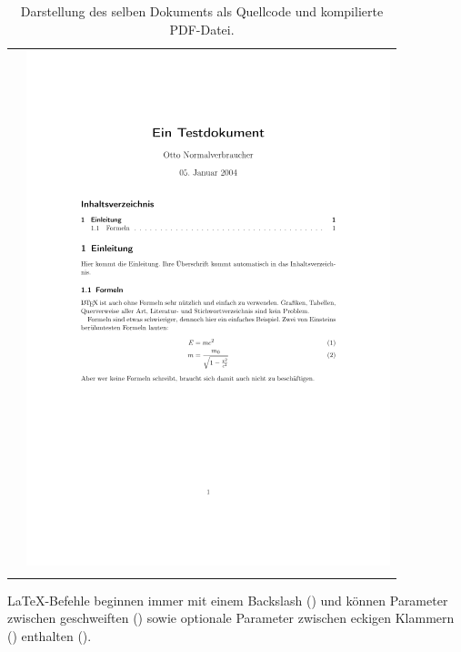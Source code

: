 \begin{table}
\begin{tabular}{c|c}
\begin{minipage}[b]{\textwidth/2}
\begin{lstlisting}
\end{lstlisting}
\end{minipage}
&
\begin{minipage}[t]{\textwidth/2}

		\includegraphics[width=\linewidth]{output}

\end{minipage}\\
\label{tab:codeOutput}
\end{tabular} 
\caption[Kompilieren eines Dokuments]{Darstellung des selben Dokuments als Quellcode und kompilierte PDF-Datei.}
\end{table}

LaTeX-Befehle beginnen immer mit einem Backslash (\ybox{$\backslash$}) und können Parameter zwischen geschweiften (\ybox{\{\}}) sowie optionale Parameter zwischen eckigen Klammern (\ybox{$\backslash$[$\backslash$]}) enthalten ().

